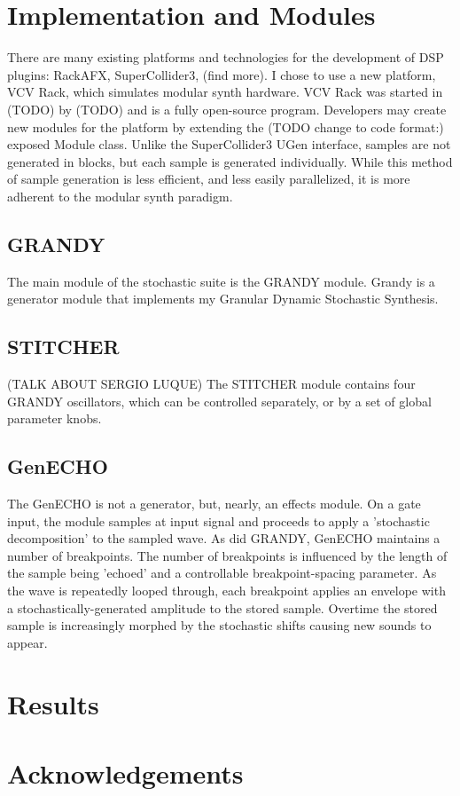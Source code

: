 \documentclass{article}
\begin{document}
\section{Implementation and Modules}
There are many existing platforms and technologies for the development of DSP plugins: RackAFX, SuperCollider3, (find more). I chose to use a new platform, VCV Rack, which simulates modular synth hardware. VCV Rack was started in (TODO) by (TODO) and is a fully open-source program. Developers may create new modules for the platform by extending the (TODO change to code format:) exposed Module class. Unlike the SuperCollider3 UGen interface, samples are not generated in blocks, but each sample is generated individually. While this method of sample generation is less efficient, and less easily parallelized, it is more adherent to the modular synth paradigm.

\subsection{GRANDY}
The main module of the stochastic suite is the GRANDY module. Grandy is a generator module that implements my Granular Dynamic Stochastic Synthesis.

\subsection{STITCHER}
(TALK ABOUT SERGIO LUQUE) The STITCHER module contains four GRANDY oscillators, which can be controlled separately, or by a set of global parameter knobs.

\subsection{GenECHO}
The GenECHO is not a generator, but, nearly, an effects module. On a gate input, the module samples at input signal and proceeds to apply a 'stochastic decomposition' to the sampled wave. As did GRANDY, GenECHO maintains a number of breakpoints. The number of breakpoints is influenced by the length of the sample being 'echoed' and a controllable breakpoint-spacing parameter. As the wave is repeatedly looped through, each breakpoint applies an envelope with a stochastically-generated amplitude to the stored sample. Overtime the stored sample is increasingly morphed by the stochastic shifts causing new sounds to appear.

\section{Results}

\section{Acknowledgements}
\end{document}
